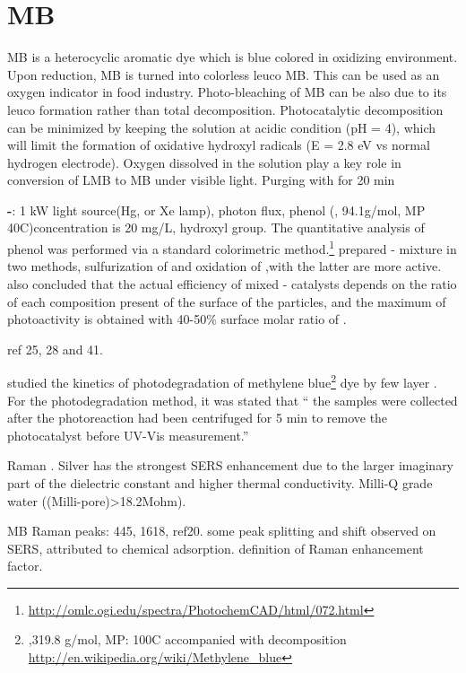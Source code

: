 \section{MB}

MB is a heterocyclic aromatic dye which is blue colored in oxidizing environment. Upon reduction, MB is turned into colorless leuco MB. This can be used as an oxygen indicator in food industry. Photo-bleaching of MB can be also due to its leuco formation rather than total decomposition. Photocatalytic decomposition can be minimized by keeping the solution at acidic condition (pH = 4), which will limit the formation of oxidative hydroxyl radicals (E = 2.8 eV vs normal hydrogen electrode). Oxygen dissolved in the solution play a key role in conversion of LMB to MB under visible light. Purging with  for 20 min


\textbf{-}: 1 kW light source(Hg, or Xe lamp), photon flux, phenol (, 94.1g/mol, MP 40C)concentration is 20 mg/L, hydroxyl group. The quantitative analysis of phenol was performed via a standard colorimetric method.\footnote{\url{http://omlc.ogi.edu/spectra/PhotochemCAD/html/072.html}}
\citeauthor{DiPaola1999} prepared - mixture in two methods, sulfurization of  and oxidation of ,with the latter are more active.
\citeauthor{DiPaola1999} also concluded that the actual efficiency of mixed - catalysts depends on the ratio of each composition present of the surface of the particles, and the maximum of photoactivity is obtained with 40-50\% surface molar ratio of .

ref 25, 28 and 41.

\citeauthor{Sreedhara2013} studied the kinetics of photodegradation of methylene blue\footnote{,319.8 g/mol, MP: 100C accompanied with decomposition \url{http://en.wikipedia.org/wiki/Methylene_blue}} dye by few layer .
For the photodegradation method, it was stated that `` the samples were collected after the photoreaction had been centrifuged for 5 min to remove the photocatalyst before UV-Vis measurement.''


Raman \cite{Xiao2007}. Silver has the strongest SERS enhancement due to the larger imaginary part of the dielectric constant and higher thermal conductivity. Milli-Q grade water ((Milli-pore)\textgreater 18.2Mohm).

MB Raman peaks: 445, 1618, ref20. some peak splitting and shift observed on SERS, attributed to chemical adsorption. definition of Raman enhancement factor.

